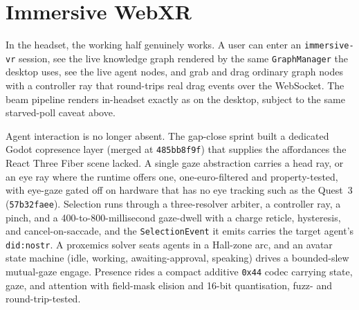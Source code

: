 \section{Immersive WebXR}

In the headset, the working half genuinely works. A user can enter an \texttt{immersive-vr} session, see the live knowledge graph rendered by the same \texttt{GraphManager} the desktop uses, see the live agent nodes, and grab and drag ordinary graph nodes with a controller ray that round-trips real drag events over the WebSocket. The beam pipeline renders in-headset exactly as on the desktop, subject to the same starved-poll caveat above.

Agent interaction is no longer absent. The gap-close sprint built a dedicated Godot copresence layer (merged at \texttt{485bb8f9f}) that supplies the affordances the React Three Fiber scene lacked. A single gaze abstraction carries a head ray, or an eye ray where the runtime offers one, one-euro-filtered and property-tested, with eye-gaze gated off on hardware that has no eye tracking such as the Quest~3 (\texttt{57b32faee}). Selection runs through a three-resolver arbiter, a controller ray, a pinch, and a 400-to-800-millisecond gaze-dwell with a charge reticle, hysteresis, and cancel-on-saccade, and the \texttt{SelectionEvent} it emits carries the target agent's \texttt{did:nostr}. A proxemics solver seats agents in a Hall-zone arc, and an avatar state machine (idle, working, awaiting-approval, speaking) drives a bounded-slew mutual-gaze engage. Presence rides a compact additive \texttt{0x44} codec carrying state, gaze, and attention with field-mask elision and 16-bit quantisation, fuzz- and round-trip-tested.

